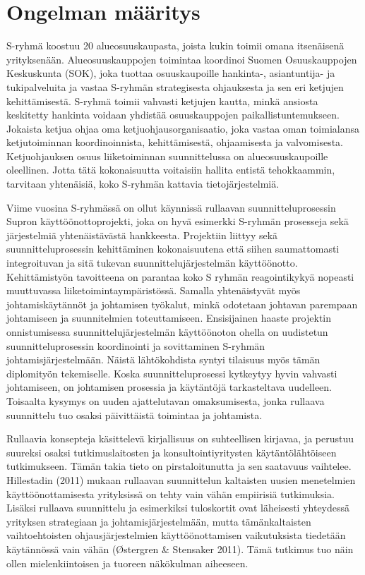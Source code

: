 \documentclass[12pt,a4paper,oneside,pdftex]{report}
\begin{document}
\section{Ongelman määritys}
\label{section:ongelma}

S-ryhmä koostuu 20 alueosuuskaupasta, joista kukin toimii omana itsenäisenä yrityksenään. Alueosuuskauppojen toimintaa koordinoi Suomen Osuuskauppojen Keskuskunta (SOK), joka tuottaa osuuskaupoille hankinta-, asiantuntija- ja tukipalveluita ja vastaa S-ryhmän strategisesta ohjauksesta ja sen eri ketjujen kehittämisestä. S-ryhmä toimii vahvasti ketjujen kautta, minkä ansiosta keskitetty hankinta voidaan yhdistää osuuskauppojen paikallistuntemukseen. Jokaista ketjua ohjaa oma ketjuohjausorganisaatio, joka vastaa oman toimialansa ketjutoiminnan koordinoinnista, kehittämisestä, ohjaamisesta ja valvomisesta. Ketjuohjauksen osuus liiketoiminnan suunnittelussa on alueosuuskaupoille oleellinen. Jotta tätä kokonaisuutta voitaisiin hallita entistä tehokkaammin, tarvitaan yhtenäisiä, koko S-ryhmän kattavia tietojärjestelmiä.

Viime vuosina S-ryhmässä on ollut käynnissä rullaavan suunnitteluprosessin Supron käyttöönottoprojekti, joka on hyvä esimerkki S-ryhmän prosesseja sekä järjestelmiä yhtenäistävästä hankkeesta. Projektiin liittyy sekä suunnitteluprosessin kehittäminen kokonaisuutena että siihen saumattomasti integroituvan ja sitä tukevan suunnittelujärjestelmän käyttöönotto. Kehittämistyön tavoitteena on parantaa koko S ryhmän reagointikykyä nopeasti muuttuvassa liiketoimintaympäristössä. Samalla yhtenäistyvät myös johtamiskäytännöt ja johtamisen työkalut, minkä odotetaan johtavan parempaan johtamiseen ja suunnitelmien toteuttamiseen. Ensisijainen haaste projektin onnistumisessa suunnittelujärjestelmän käyttöönoton ohella on uudistetun suunnitteluprosessin koordinointi ja sovittaminen S-ryhmän johtamisjärjestelmään. Näistä lähtökohdista syntyi tilaisuus myös tämän diplomityön tekemiselle. Koska suunnitteluprosessi kytkeytyy hyvin vahvasti johtamiseen, on johtamisen prosessia ja käytäntöjä tarkasteltava uudelleen. Toisaalta kysymys on uuden ajattelutavan omaksumisesta, jonka rullaava suunnittelu tuo osaksi päivittäistä toimintaa ja johtamista.

Rullaavia konsepteja käsittelevä kirjallisuus on suhteellisen kirjavaa, ja perustuu suureksi osaksi tutkimuslaitosten ja konsultointiyritysten käytäntölähtöiseen tutkimukseen. Tämän takia tieto on pirstaloitunutta ja sen saatavuus vaihtelee. Hillestadin (2011) mukaan rullaavan suunnittelun kaltaisten uusien menetelmien käyttöönottamisesta yrityksissä on tehty vain vähän empiirisiä tutkimuksia. Lisäksi rullaava suunnittelu ja esimerkiksi tuloskortit ovat läheisesti yhteydessä yrityksen strategiaan ja johtamisjärjestelmään, mutta tämänkaltaisten vaihtoehtoisten ohjausjärjestelmien käyttöönottamisen vaikutuksista tiedetään käytännössä vain vähän (Østergren & Stensaker 2011). Tämä tutkimus tuo näin ollen mielenkiintoisen ja tuoreen näkökulman aiheeseen.
\end{document}
